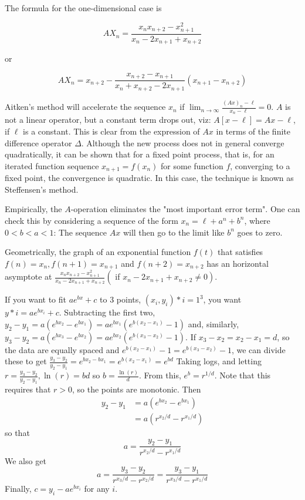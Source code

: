The formula for the one-dimensional case is

$$
AX_n = \frac{x_n x_{n+2} - x_{n+1}^2}{x_n-2x_{n+1}+ x_{n+2} }
$$

or

$$
AX_n = x_{n+2} - \frac{x_{n+2} - x_{n+1} }{x_n + x_{n+2} - 2 x_{n+1} }(x_{n+1}-x_{n+2})
$$

Aitken's method will accelerate the sequence $x_{n}$ if $\lim_{n \rightarrow \infty} \frac{(A x)_{n}-\ell}{x_{n}-\ell}=0$.
$A$ is not a linear operator, but a constant term drops out, viz: $A[x-\ell]=A x-\ell$, if $\ell$ is a constant. This is clear from the expression of $A x$ in terms of the finite difference operator $\Delta$.
Although the new process does not in general converge quadratically, it can be shown that for a fixed point process, that is, for an iterated function sequence $x_{n+1}=f\left(x_{n}\right)$ for some function $f$, converging to a fixed point, the convergence is quadratic. In this case, the technique is known as Steffensen's method.

Empirically, the $A$-operation eliminates the "most important error term". One can check this by considering a sequence of the form $x_{n}=\ell+a^{n}+b^{n}$, where $0<b<a<1$: The sequence $A x$ will then go to the limit like $b^{n}$ goes to zero.

Geometrically, the graph of an exponential function $f(t)$ that satisfies \(f(n)=x_{n}, f(n+1)=x_{n+1}\) and \(f(n+2)=x_{n+2}\) has an horizontal asymptote at \(\frac{x_{n} x_{n+2}-x_{n+1}^{2}}{x_{n}-2 x_{n+1}+x_{n+2}}\left(\right.\) if \(\left.x_{n}-2 x_{n+1}+x_{n+2} \neq 0\right)\).

If you want to fit \(a e^{b x}+c\) to 3 points, \(\left(x_{i}, y_{i}\right)*{i=1}^{3}\), you want \(y*{i}=a e^{b x_{i}}+c .\)
Subtracting the first two, \(y_{2}-y_{1}=a\left(e^{b x_{2}}-e^{b x_{1}}\right)=a e^{b x_{1}}\left(e^{b\left(x_{2}-x_{1}\right)}-1\right)\) and, similarly, \(y_{3}-y_{2}=a\left(e^{b x_{3}}-e^{b x_{2}}\right)=a e^{b x_{2}}\left(e^{b\left(x_{3}-x_{2}\right)}-1\right) .\)
If \(x_{3}-x_{2}=x_{2}-x_{1}=d\), so the data are equally spaced and \(e^{b\left(x_{2}-x_{1}\right)}-1=e^{b\left(x_{3}-x_{2}\right)}-1\), we can divide these to get
\(\frac{y_{3}-y_{2}}{y_{2}-y_{1}}=e^{b x_{2}-b x_{1}}=e^{b\left(x_{2}-x_{1}\right)}=e^{b d}\)
Taking logs, and letting \(r=\frac{y_{3}-y_{2}}{y_{2}-y_{1}}, \ln (r)=b d\) so \(b=\frac{\ln (r)}{d} .\) From this, \(e^{b}=r^{1 / d} .\)
Note that this requires that \(r>0\), so the points are monotonic.
Then
\[
\begin{aligned}
y_{2}-y_{1} &=a\left(e^{b x_{2}}-e^{b x_{1}}\right) \\
&=a\left(r^{x_{2} / d}-r^{x_{1} / d}\right)
\end{aligned}
\]
so that
\[
a=\frac{y_{2}-y_{1}}{r^{x_{2} / d}-r^{x_{1} / d}}
\]
We also get
\[
a=\frac{y_{3}-y_{2}}{r^{x_{3} / d}-r^{x_{2} / d}}=\frac{y_{3}-y_{1}}{r^{x_{3} / d}-r^{x_{1} / d}}
\]
Finally, \(c=y_{i}-a e^{b x_{i}}\) for any \(i\).

